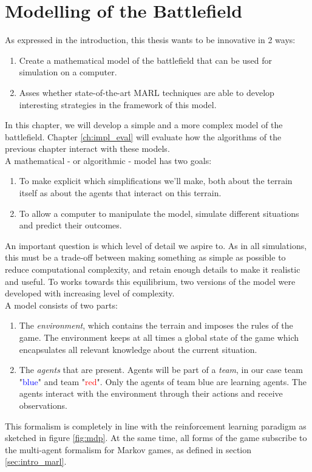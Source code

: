 \chapter{Modelling of the Battlefield}
\label{ch:modelling}
As expressed in the introduction, this thesis wants to be innovative in 2 ways:
\begin{enumerate}
    \item Create a mathematical model of the battlefield that can be used for simulation on a computer.
    \item Asses whether state-of-the-art MARL techniques are able to develop interesting strategies in the framework of this model.
\end{enumerate}
In this chapter, we will develop a simple and a more complex model of the battlefield.  Chapter \ref{ch:impl_eval} will evaluate how the algorithms of the previous chapter interact with these models.\\
A mathematical - or algorithmic - model has two goals:
\begin{enumerate}
    \item To make explicit which simplifications we'll make, both about the terrain itself as about the agents that interact on this terrain.
    \item To allow a computer to manipulate the model, simulate different situations and predict their outcomes.
\end{enumerate}
An important question is which level of detail we aspire to. As in all simulations, this must be a trade-off between making something as simple as possible to reduce computational complexity, and retain enough details to make it realistic and useful. To works towards this equilibrium, two versions of the model were developed with increasing level of complexity.\\
A model consists of two parts:
\begin{enumerate}
    \item The \emph{environment}, which contains the terrain and imposes the rules of the game. The environment keeps at all times a global state of the game which encapsulates all relevant knowledge about the current situation.
    \item The \emph{agents} that are present. Agents will be part of a \emph{team}, in our case team "\textcolor{blue}{blue}" and team "\textcolor{red}{red}". Only the agents of team blue are learning agents. The agents interact with the environment through their actions and receive observations.
\end{enumerate}
This formalism is completely in line with the reinforcement learning paradigm as sketched in figure \ref{fig:mdp}. At the same time, all forms of the game subscribe to the multi-agent formalism for Markov games, as defined in section \ref{sec:intro_marl}.

